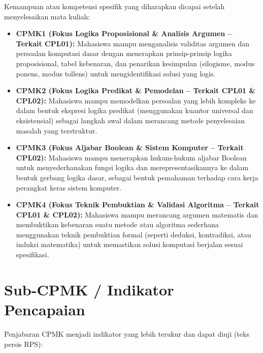 \documentclass[../main]{subfiles}
\begin{document}
Kemampuan atau kompetensi spesifik yang diharapkan dicapai setelah menyelesaikan mata kuliah:

\begin{itemize}[leftmargin=*]
  \item \textbf{CPMK1 (Fokus Logika Proposisional \& Analisis Argumen -- Terkait CPL01):} Mahasiswa mampu menganalisis validitas argumen dan persoalan komputasi dasar dengan menerapkan prinsip-prinsip logika proposisional, tabel kebenaran, dan penarikan kesimpulan (silogisme, modus ponens, modus tollens) untuk mengidentifikasi solusi yang logis.
  \item \textbf{CPMK2 (Fokus Logika Predikat \& Pemodelan -- Terkait CPL01 \& CPL02):} Mahasiswa mampu memodelkan persoalan yang lebih kompleks ke dalam bentuk ekspresi logika predikat (menggunakan kuantor universal dan eksistensial) sebagai langkah awal dalam merancang metode penyelesaian masalah yang terstruktur.
  \item \textbf{CPMK3 (Fokus Aljabar Boolean \& Sistem Komputer -- Terkait CPL02):} Mahasiswa mampu menerapkan hukum-hukum aljabar Boolean untuk menyederhanakan fungsi logika dan merepresentasikannya ke dalam bentuk gerbang logika dasar, sebagai bentuk pemahaman terhadap cara kerja perangkat keras sistem komputer.
  \item \textbf{CPMK4 (Fokus Teknik Pembuktian \& Validasi Algoritma -- Terkait CPL01 \& CPL02):} Mahasiswa mampu merancang argumen matematis dan membuktikan kebenaran suatu metode atau algoritma sederhana menggunakan teknik pembuktian formal (seperti deduksi, kontradiksi, atau induksi matematika) untuk memastikan solusi komputasi berjalan sesuai spesifikasi.
\end{itemize}

\section*{Sub-CPMK / Indikator Pencapaian}

Penjabaran CPMK menjadi indikator yang lebih terukur dan dapat diuji (teks persis RPS):
\end{document}
